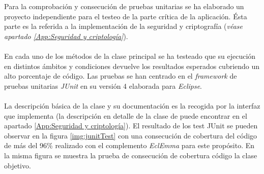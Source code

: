 \documentclass[../PFC.tex]{subfiles}
\begin{document}
Para la comprobación y consecución de pruebas unitarias se ha elaborado un proyecto independiente para el testeo de la parte crítica de la aplicación. Ésta parte es la referida a la implementación de la seguridad y criptografía (\textit{véase apartado \ref{App:Seguridad y criptología}}).
\\\\
En cada uno de los métodos de la clase principal se ha testeado que su ejecución en distintos ámbitos y condiciones devuelve los resultados esperados cubriendo un alto porcentaje de código. Las pruebas se han centrado en el \textit{framework} de pruebas unitarias \textit{JUnit}\cite{junit} en su versión 4 elaborada para \textit{Eclipse}\cite{eclipse}.
\\\\
La descripción básica de la clase y su documentación es la recogida por la interfaz que implementa (la descripción en detalle de la clase de puede encontrar en el apartado \ref{App:Seguridad y criptología}). El resultado de los test JUnit se pueden observar en la figura \ref{img:junitTest} con una consecución de cobertura del código de más del 96\% realizado con el complemento \textit{EclEmma}\cite{eclemma} para este propósito. En la misma figura se muestra la prueba de consecución de cobertura código la clase objetivo. 

\end{document}
